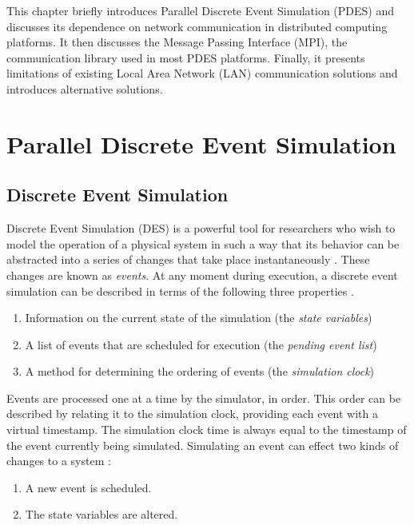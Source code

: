 \documentclass[11pt]{book}
\begin{document}
This chapter briefly introduces Parallel Discrete Event Simulation (PDES) and
discusses its dependence on network communication in distributed computing
platforms. It then discusses the Message Passing Interface (MPI), the
communication library used in most PDES platforms. Finally, it presents
limitations of existing Local Area Network (LAN) communication solutions and
introduces alternative solutions.

\section{\textbf{Parallel Discrete Event Simulation}}

\subsection{\textbf{Discrete Event Simulation}}

Discrete Event Simulation (DES) is a powerful tool for researchers who wish to
model the operation of a physical system in such a way that its behavior can be
abstracted into a series of changes that take place instantaneously
\cite{jacob-13}. These changes are known as \textit{events}. At any moment
during execution, a discrete event simulation can be described in terms of the
following three properties \cite{fujimoto-pdes} \cite{jacob-13} \cite{page-94}.

\begin{enumerate}
  \item Information on the current state of the simulation (the \textit{state variables})
  \item A list of events that are scheduled for execution (the \textit{pending
    event list})
  \item A method for determining the ordering of events (the \textit{simulation
    clock})
\end{enumerate}

Events are processed one at a time by the simulator, in order. This order can be
described by relating it to the simulation clock, providing each event with a
virtual timestamp. The simulation clock time is always equal to the timestamp of
the event currently being simulated. Simulating an event can effect two kinds of
changes to a system \cite{fujimoto-pdes}:

\begin{enumerate}
  \item A new event is scheduled.
  \item The state variables are altered.
\end{enumerate}
\end{document}
